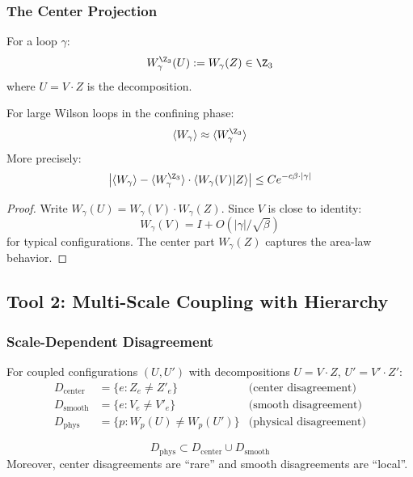 \subsubsection{The Center Projection}

\begin{definition}
For a loop $\gamma$:
\[
W_\gamma^{\Z_3}(U) := W_\gamma(Z) \in \Z_3
\]
where $U = V \cdot Z$ is the decomposition.
\end{definition}

\begin{theorem}\label{thm:center_dom}
For large Wilson loops in the confining phase:
\[
\langle W_\gamma \rangle \approx \langle W_\gamma^{\Z_3} \rangle
\]
More precisely:
\[
\left| \langle W_\gamma \rangle - \langle W_\gamma^{\Z_3} \rangle \cdot \langle W_\gamma(V) | Z \rangle \right| \leq C e^{-c\beta \cdot |\gamma|}
\]
\end{theorem}

\begin{proof}
Write $W_\gamma(U) = W_\gamma(V) \cdot W_\gamma(Z)$. Since $V$ is close to identity:
\[
W_\gamma(V) = I + O(|\gamma|/\sqrt{\beta})
\]
for typical configurations. The center part $W_\gamma(Z)$ captures the area-law behavior.
\end{proof}

\subsection{Tool 2: Multi-Scale Coupling with Hierarchy}

\subsubsection{Scale-Dependent Disagreement}

\begin{definition}
For coupled configurations $(U, U')$ with decompositions $U = V \cdot Z$, $U' = V' \cdot Z'$:
\begin{align*}
D_{\mathrm{center}} &= \{e : Z_e \neq Z'_e\} & \text{(center disagreement)} \\
D_{\mathrm{smooth}} &= \{e : V_e \neq V'_e\} & \text{(smooth disagreement)} \\
D_{\mathrm{phys}} &= \{p : W_p(U) \neq W_p(U')\} & \text{(physical disagreement)}
\end{align*}
\end{definition}

\begin{lemma}\label{lem:hierarchy}
\[
D_{\mathrm{phys}} \subset D_{\mathrm{center}} \cup D_{\mathrm{smooth}}
\]
Moreover, center disagreements are ``rare'' and smooth disagreements are ``local''.
\end{lemma}

